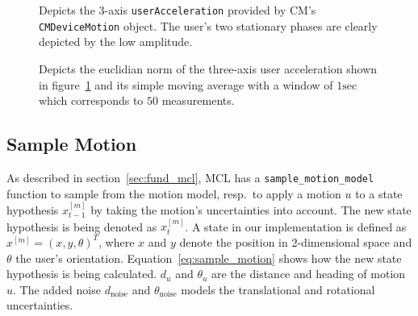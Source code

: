 \begin{figure}
\caption{Depicts the 3-axis \texttt{userAcceleration} provided by \acs{CM}'s \texttt{CMDeviceMotion} object. The user's two stationary phases are clearly depicted by the low amplitude.}
\label{fig:mm_stationary_1}
\end{figure}

\begin{figure}
\caption{Depicts the euclidian norm of the three-axis user acceleration shown in figure~\ref{fig:mm_stationary_1} and its simple moving average with a window of $1 \text{sec}$ which corresponds to $50$ measurements.}
\label{fig:mm_stationary_2}
\end{figure}



\subsection{Sample Motion}\label{sec:algo_sample_motion}
As described in section~\ref{sec:fund_mcl}, \acs{MCL} has a \texttt{sample\_motion\_model} function to sample from the motion model, resp.\ to apply a motion $u$ to a state hypothesis $x^{[m]}_{t-1}$ by taking the motion's uncertainties into account. The new state hypothesis is being denoted as $x^{[m]}_t$. A state in our implementation is defined as $x^{[m]} = (x, y, \theta)^T$, where $x$ and $y$ denote the position in 2-dimensional space and $\theta$ the user's orientation. Equation~\ref{eq:sample_motion} shows how the new state hypothesis is being calculated. $d_u$ and $\theta_u$ are the distance and heading of motion $u$. The added noise $d_\text{noise}$ and $\theta_\text{noise}$ models the translational and rotational uncertainties.

